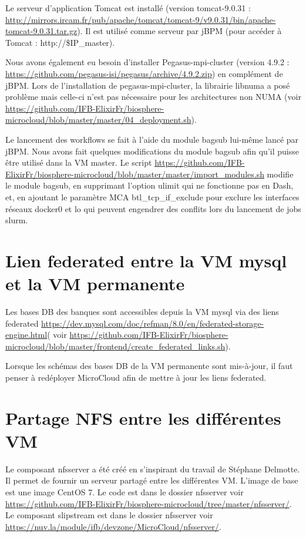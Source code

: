 Le serveur d'application Tomcat est installé (version tomcat-9.0.31 : \url{http://mirrors.ircam.fr/pub/apache/tomcat/tomcat-9/v9.0.31/bin/apache-tomcat-9.0.31.tar.gz}).
Il est utilisé comme serveur par jBPM (pour accéder à Tomcat : http://\$IP\_master).

Nous avons également eu besoin d'installer Pegasus-mpi-cluster (version 4.9.2 : \url{https://github.com/pegasus-isi/pegasus/archive/4.9.2.zip}) en complément de jBPM. Lors de l'installation de pegasus-mpi-cluster, la librairie libnuma a posé problème mais celle-ci n'est pas nécessaire pour les architectures non NUMA (voir \url{https://github.com/IFB-ElixirFr/biosphere-microcloud/blob/master/master/04_deployment.sh}).

Le lancement des workflows se fait à l'aide du module bagsub lui-même lancé par jBPM. Nous avons fait quelques modifications du module bagsub afin qu'il puisse être utilisé dans la VM master.
Le script \url{https://github.com/IFB-ElixirFr/biosphere-microcloud/blob/master/master/import_modules.sh} modifie le module bagsub, en supprimant l'option ulimit qui ne fonctionne pas en Dash, et, en ajoutant le paramètre MCA btl\_tcp\_if\_exclude pour exclure les interfaces réseaux docker0 et lo qui peuvent engendrer des conflits lors du lancement de jobs slurm.

\section{Lien federated entre la VM mysql et  la VM permanente}
Les bases DB des banques sont accessibles depuis la VM mysql via des liens federated \url{https://dev.mysql.com/doc/refman/8.0/en/federated-storage-engine.html}( 
voir \url{https://github.com/IFB-ElixirFr/biosphere-microcloud/blob/master/frontend/create_federated_links.sh}).
\bigskip

\begin{mycolorbox}
	Lorsque les schémas des bases DB de la VM permanente sont mis-à-jour, il faut penser à redéployer MicroCloud afin de mettre à jour les liens federated.
\end{mycolorbox}

\section{Partage NFS entre les différentes VM}

\label{nfsserver} Le composant nfsserver a été créé en s'inspirant du travail de Stéphane Delmotte.
Il permet de fournir un serveur partagé entre les différentes VM.
L'image de base est une image CentOS 7.
Le code est dans le dossier nfsserver voir  \url{https://github.com/IFB-ElixirFr/biosphere-microcloud/tree/master/nfsserver/}.
Le composant slipstream est dans le dossier nfsserver voir
\url{https://nuv.la/module/ifb/devzone/MicroCloud/nfsserver/}.

